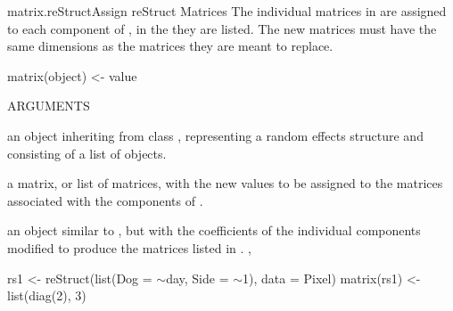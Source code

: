 \documentclass[pdftex]{article} \usepackage{url,graphicx}
\renewcommand{\Twiddle}{\mbox{\(\sim\)}}
\begin{document}
\begin{Helpfile}{matrix\Co{<-}.reStruct}{Assign reStruct Matrices}
The individual matrices in  are assigned to each
 component of , in the they are listed. The
new matrices must have the same dimensions as the matrices they are
meant to replace.
\begin{Example}
matrix(object) <-  value
\end{Example}
\begin{Argument}{ARGUMENTS}
\item[\Co{object:}]
an object inheriting from class ,
representing a random effects structure and consisting of a list of
 objects.
\item[\Co{value:}]
a matrix, or list of matrices, with the new values to be
assigned to the matrices associated with the  components
of .
\end{Argument}
an  object similar to , but with the
coefficients of the individual  components modified to
produce the matrices listed in .
, 
\need 15pt
\vspace{-16pt} 
\begin{Example}
rs1 <- reStruct(list(Dog = \Twiddle day, Side = \Twiddle 1), data = Pixel)
matrix(rs1) <- list(diag(2), 3)
\end{Example}
\end{Helpfile}
\end{document}
